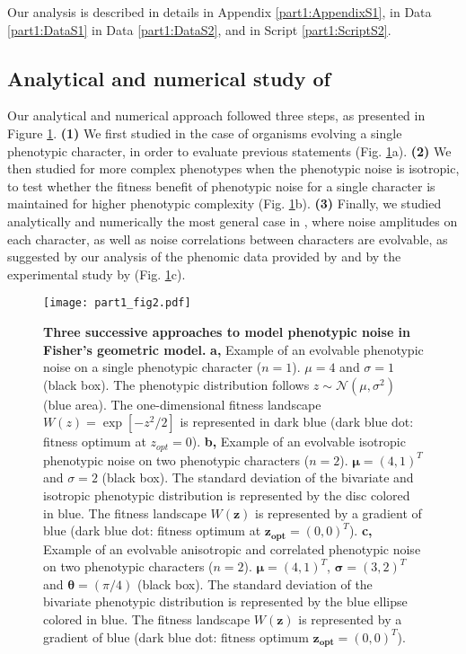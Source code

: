 Our analysis is described in details in Appendix \ref{part1:AppendixS1}, in Data \ref{part1:DataS1} in Data \ref{part1:DataS2}, and in Script \ref{part1:ScriptS2}.


\subsection{Analytical and numerical study of {\sigmaFGM}}

Our analytical and numerical approach followed three steps, as presented in Figure \ref{part1:fig2}. \textbf{(1)} We first studied {\sigmaFGM} in the case of organisms evolving a single phenotypic character, in order to evaluate previous statements \citep{zhang-et-al-2009,eldar-and-elowitz-2010,bodi-et-al-2017} (Fig. \ref{part1:fig2}a). \textbf{(2)} We then studied {\sigmaFGM} for more complex phenotypes when the phenotypic noise is isotropic, to test whether the fitness benefit of phenotypic noise for a single character is maintained for higher phenotypic complexity (Fig. \ref{part1:fig2}b). \textbf{(3)} Finally, we studied analytically and numerically the most general case in {\sigmaFGM}, where noise amplitudes on each character, as well as noise correlations between characters are evolvable, as suggested by our analysis of the phenomic data provided by \cite{yvert-et-al-2013} and by the experimental study by \cite{cressler-et-al-2017} (Fig. \ref{part1:fig2}c).

\begin{figure}[!h]
\begin{adjustwidth}{-0in}{0in}
\centering
\texttt{[image: part1\_fig2.pdf]}
\end{adjustwidth}
\caption[Three successive approaches to model phenotypic noise in Fisher's geometric model.]{
\textbf{Three successive approaches to model phenotypic noise in Fisher's geometric model.}
\textbf{a,} Example of an evolvable phenotypic noise on a single phenotypic character ($n=1$). $\mu=4$ and $\sigma=1$ (black box). The phenotypic distribution follows $z \sim \mathcal{N}(\mu,\sigma^2)$ (blue area). The one-dimensional fitness landscape $W(z)=\exp\left[-z^2/2\right]$ is represented in dark blue (dark blue dot: fitness optimum at $z_{opt} = 0$).
\textbf{b,} Example of an evolvable isotropic phenotypic noise on two phenotypic characters ($n=2$). $\boldsymbol{\mu} = (4,1)^T$ and $\sigma=2$ (black box). The standard deviation of the bivariate and isotropic phenotypic distribution is represented by the disc colored in blue. The fitness landscape $W(\boldsymbol{z})$ is represented by a gradient of blue (dark blue dot: fitness optimum at $\boldsymbol{z_{opt}} = (0,0)^T$).
\textbf{c,} Example of an evolvable anisotropic and correlated phenotypic noise on two phenotypic characters ($n=2$).  $\boldsymbol{\mu} = (4,1)^T$, $\boldsymbol{\sigma} = (3,2)^T$ and $\boldsymbol{\theta} = (\pi/4)$ (black box). The standard deviation of the bivariate phenotypic distribution is represented by the blue ellipse colored in blue. The fitness landscape $W(\boldsymbol{z})$ is represented by a gradient of blue (dark blue dot: fitness optimum $\boldsymbol{z_{opt}} = (0,0)^T$).
}
\label{part1:fig2}
\end{figure}


